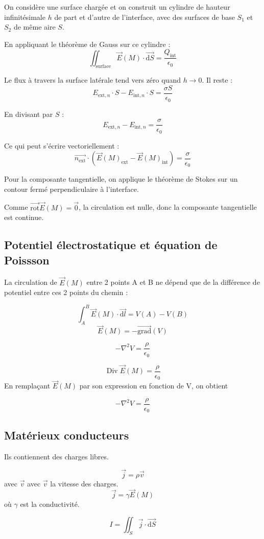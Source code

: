 \documentclass[french]{yLectureNote}
\renewcommand{\vec}{\overrightarrow}
\newcommand{\dd}{\mathrm{d}}
\newcommand{\lap}{\nabla^2}
\newcommand{\E}{\vec{E}(M)}
\DeclareMathOperator{\Div}{Div}
\newcommand{\rot}{\vec{\mathrm{rot}}}
\newcommand{\grad}{\vec{\mathrm{grad}}}
\begin{document}
\begin{myproof}
    On considère une surface chargée et on construit un cylindre de hauteur infinitésimale $h$ de part et d'autre de l'interface, avec des surfaces de base $S_1$ et $S_2$ de même aire $S$.

    En appliquant le théorème de Gauss sur ce cylindre :
    $$\iint_{\text{surface}} \E \cdot \vec{\dd S} = \frac{Q_{\text{int}}}{\epsilon_0}$$

    Le flux à travers la surface latérale tend vers zéro quand $h \to 0$. Il reste :
    $$E_{\text{ext},n} \cdot S - E_{\text{int},n} \cdot S = \frac{\sigma S}{\epsilon_0}$$

    En divisant par $S$ :
    $$E_{\text{ext},n} - E_{\text{int},n} = \frac{\sigma}{\epsilon_0}$$

    Ce qui peut s'écrire vectoriellement : $$\vec{n_{\text{ext}}} \cdot (\E_{\text{ext}} - \E_{\text{int}}) = \frac{\sigma}{\epsilon_0}$$

    Pour la composante tangentielle, on applique le théorème de Stokes sur un contour fermé perpendiculaire à l'interface. 
    
    Comme $\rot \E = \vec{0}$, la circulation est nulle, donc la composante tangentielle est continue.
\end{myproof}
\subsection{Potentiel électrostatique et équation de Poissson}
La circulation de $\E$ entre 2 points A et B ne dépend que de la différence de potentiel entre ces 2 points du chemin :
\begin{theorem}
    $$\int_A^B \E \cdot \vec{\dd l} = V(A)-V(B)$$
    $$ \E = -\grad(V)$$
\end{theorem}
\begin{theorem}
   $$-\lap V = \frac{\rho}{\epsilon_0}$$
\end{theorem}
\begin{myproof}
      $$\Div \E = \frac{\rho}{\epsilon_0}$$ En remplaçant $\E$ par son expression en fonction de V, on obtient

      $$-\lap V = \frac{\rho}{\epsilon_0}$$
\end{myproof}
\subsection{Matérieux conducteurs}
Ils contiennent des charges libres. 
\begin{definition}
    $$\vec{j} = \rho\vec{v}$$ avec $\vec{v}$ avec $\vec{v}$ la vitesse des charges.
    $$\vec{j} = \gamma \E$$ où $\gamma$ est la conductivité.
\end{definition}
\begin{theorem}
    $$I = \iint_S \vec{j}\cdot \vec{\dd S}$$
\end{theorem}
\end{document}
